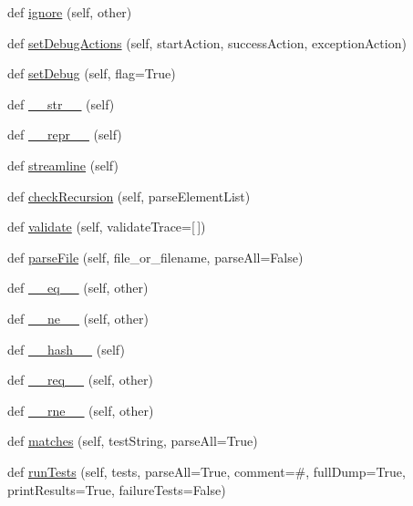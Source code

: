 \begin{DoxyCompactItemize}
\item 
def \hyperlink{classsetuptools_1_1__vendor_1_1pyparsing_1_1ParserElement_a8312fa721c50e624c6aaeb5b414f6f8b}{ignore} (self, other)
\item 
def \hyperlink{classsetuptools_1_1__vendor_1_1pyparsing_1_1ParserElement_ad451f13e3d97e07edc726f65fecc37a8}{set\+Debug\+Actions} (self, start\+Action, success\+Action, exception\+Action)
\item 
def \hyperlink{classsetuptools_1_1__vendor_1_1pyparsing_1_1ParserElement_ae589616c030e7bc76f86c139b60e2bc6}{set\+Debug} (self, flag=True)
\item 
def \hyperlink{classsetuptools_1_1__vendor_1_1pyparsing_1_1ParserElement_a62581c4d9d309878385b1111fd390473}{\+\_\+\+\_\+str\+\_\+\+\_\+} (self)
\item 
def \hyperlink{classsetuptools_1_1__vendor_1_1pyparsing_1_1ParserElement_ac68444f387913611e94b7038a49c507c}{\+\_\+\+\_\+repr\+\_\+\+\_\+} (self)
\item 
def \hyperlink{classsetuptools_1_1__vendor_1_1pyparsing_1_1ParserElement_ac6937508ff09119b5bd3b6d7b6711845}{streamline} (self)
\item 
def \hyperlink{classsetuptools_1_1__vendor_1_1pyparsing_1_1ParserElement_a44ad5922689943f83c7d3b058f703175}{check\+Recursion} (self, parse\+Element\+List)
\item 
def \hyperlink{classsetuptools_1_1__vendor_1_1pyparsing_1_1ParserElement_ad3e1e503c2a2e6bbece407e4e6b68651}{validate} (self, validate\+Trace=\mbox{[}$\,$\mbox{]})
\item 
def \hyperlink{classsetuptools_1_1__vendor_1_1pyparsing_1_1ParserElement_a9d224aee01e69b56fc10f467c860e78c}{parse\+File} (self, file\+\_\+or\+\_\+filename, parse\+All=False)
\item 
def \hyperlink{classsetuptools_1_1__vendor_1_1pyparsing_1_1ParserElement_a5043f8497ee649455795186744db5300}{\+\_\+\+\_\+eq\+\_\+\+\_\+} (self, other)
\item 
def \hyperlink{classsetuptools_1_1__vendor_1_1pyparsing_1_1ParserElement_adcacf5654535d8507e7bff8634e9a3c1}{\+\_\+\+\_\+ne\+\_\+\+\_\+} (self, other)
\item 
def \hyperlink{classsetuptools_1_1__vendor_1_1pyparsing_1_1ParserElement_ac2c4dc9a984b1cf325b5325fbdb85e48}{\+\_\+\+\_\+hash\+\_\+\+\_\+} (self)
\item 
def \hyperlink{classsetuptools_1_1__vendor_1_1pyparsing_1_1ParserElement_a10cccec6a7c5b2e8684ea1b6acdb2fe7}{\+\_\+\+\_\+req\+\_\+\+\_\+} (self, other)
\item 
def \hyperlink{classsetuptools_1_1__vendor_1_1pyparsing_1_1ParserElement_a63c613d4d7dbb47e68e568b7fd9743f7}{\+\_\+\+\_\+rne\+\_\+\+\_\+} (self, other)
\item 
def \hyperlink{classsetuptools_1_1__vendor_1_1pyparsing_1_1ParserElement_a2afc43378181105cbee5ab5dd4ed776f}{matches} (self, test\+String, parse\+All=True)
\item 
def \hyperlink{classsetuptools_1_1__vendor_1_1pyparsing_1_1ParserElement_ae01ef499653e57fa7cd9aa2d3fe5cd4c}{run\+Tests} (self, tests, parse\+All=True, comment=\textquotesingle{}\#\textquotesingle{}, full\+Dump=True, print\+Results=True, failure\+Tests=False)
\end{DoxyCompactItemize}
